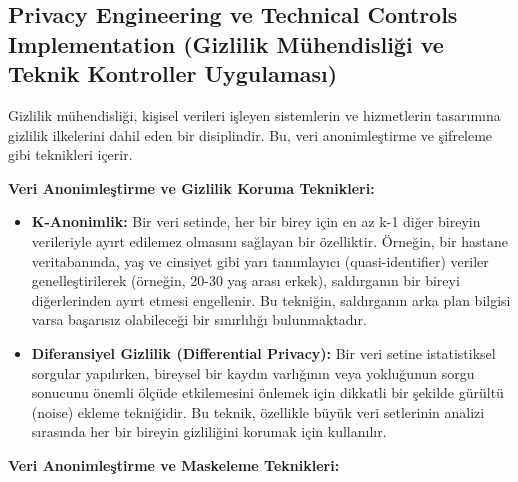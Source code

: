 \subsection{Privacy Engineering ve Technical Controls Implementation (Gizlilik Mühendisliği ve Teknik Kontroller Uygulaması)}

Gizlilik mühendisliği, kişisel verileri işleyen sistemlerin ve hizmetlerin tasarımına gizlilik ilkelerini dahil eden bir disiplindir. Bu, veri anonimleştirme ve şifreleme gibi teknikleri içerir.

\textbf{Veri Anonimleştirme ve Gizlilik Koruma Teknikleri:}
\begin{itemize}
    \item \textbf{K-Anonimlik:} Bir veri setinde, her bir birey için en az k-1 diğer bireyin verileriyle ayırt edilemez olmasını sağlayan bir özelliktir. Örneğin, bir hastane veritabanında, yaş ve cinsiyet gibi yarı tanımlayıcı (quasi-identifier) veriler genelleştirilerek (örneğin, 20-30 yaş arası erkek), saldırganın bir bireyi diğerlerinden ayırt etmesi engellenir. Bu tekniğin, saldırganın arka plan bilgisi varsa başarısız olabileceği bir sınırlılığı bulunmaktadır.
    \item \textbf{Diferansiyel Gizlilik (Differential Privacy):} Bir veri setine istatistiksel sorgular yapılırken, bireysel bir kaydın varlığının veya yokluğunun sorgu sonucunu önemli ölçüde etkilemesini önlemek için dikkatli bir şekilde gürültü (noise) ekleme tekniğidir. Bu teknik, özellikle büyük veri setlerinin analizi sırasında her bir bireyin gizliliğini korumak için kullanılır.
\end{itemize}

\textbf{Veri Anonimleştirme ve Maskeleme Teknikleri:}

